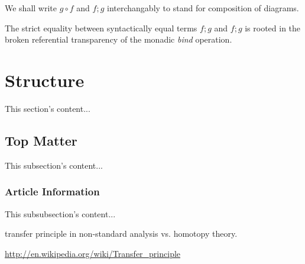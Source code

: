 \documentclass{article}
\begin{document}
We shall write $g \circ f$ and $f;g$ interchangably to stand for
composition of diagrams.

The strict equality between syntactically equal terms $f;g$ and $f;g$
is rooted in the broken referential transparency of the monadic
\emph{bind} operation.

\section{Structure}
This section's content...

\subsection{Top Matter}
This subsection's content...

\subsubsection{Article Information}
This subsubsection's content...


transfer principle in non-standard analysis vs. homotopy theory.

\url{http://en.wikipedia.org/wiki/Transfer_principle}
\end{document}
